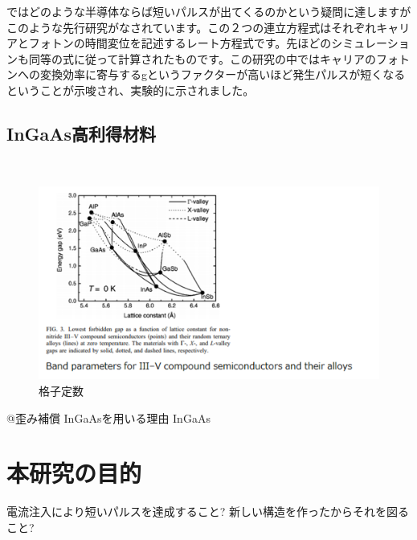 ではどのような半導体ならば短いパルスが出てくるのかという疑問に達しますがこのような先行研究がなされています。この２つの連立方程式はそれぞれキャリアとフォトンの時間変位を記述するレート方程式です。先ほどのシミュレーションも同等の式に従って計算されたものです。この研究の中ではキャリアのフォトンへの変換効率に寄与するgというファクターが高いほど発生パルスが短くなるということが示唆され、実験的に示されました。


\subsection{InGaAs高利得材料}
\

\begin{figure}[t]
	\centering
	\includegraphics[width=15cm]{figure/fig_1_1_lattice_constance.png}
	\caption{格子定数}
	\label{fig:fig_latice_constancce}
\end{figure}


@歪み補償
InGaAsを用いる理由
InGaAs

\section{本研究の目的}
電流注入により短いパルスを達成すること?
新しい構造を作ったからそれを図ること?
